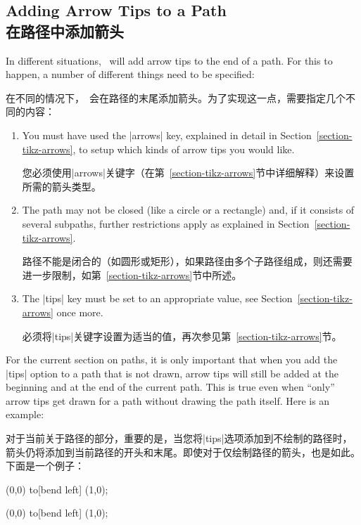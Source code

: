 \subsection{Adding Arrow Tips to a Path\\在路径中添加箭头}
\label{section-arrow-tip-action}

In different situations, \tikzname\ will add arrow tips to the end of a path.
For this to happen, a number of different things need to be specified:

在不同的情况下，\tikzname\ 会在路径的末尾添加箭头。为了实现这一点，需要指定几个不同的内容：

\begin{enumerate}
    \item You must have used the |arrows| key, explained in detail in
        Section~\ref{section-tikz-arrows}, to setup which kinds of arrow tips
        you would like.

        您必须使用|arrows|关键字（在第~\ref{section-tikz-arrows}节中详细解释）来设置所需的箭头类型。
    \item The path may not be closed (like a circle or a rectangle) and, if
        it consists of several subpaths, further restrictions apply as
        explained in Section~\ref{section-tikz-arrows}.

        路径不能是闭合的（如圆形或矩形），如果路径由多个子路径组成，则还需要进一步限制，如第~\ref{section-tikz-arrows}节中所述。
    \item The |tips| key must be set to an appropriate value, see
        Section~\ref{section-tikz-arrows} once more.

        必须将|tips|关键字设置为适当的值，再次参见第~\ref{section-tikz-arrows}节。
\end{enumerate}

For the current section on paths, it is only important that when you add the
|tips| option to a path that is not drawn, arrow tips will still be added at
the beginning and at the end of the current path. This is true even when
``only'' arrow tips get drawn for a path without drawing the path itself. Here
is an example:

对于当前关于路径的部分，重要的是，当您将|tips|选项添加到不绘制的路径时，箭头仍将添加到当前路径的开头和末尾。即使对于仅绘制路径的箭头，也是如此。下面是一个例子：

%
\begin{codeexample}[width=2cm,preamble={\usetikzlibrary{arrows.meta,bending}}]
\tikz {} (0,0) to[bend left] (1,0);
\end{codeexample}
%
\begin{codeexample}[width=2cm,preamble={\usetikzlibrary{arrows.meta,bending}}]
\tikz {} (0,0) to[bend left] (1,0);
\end{codeexample}


